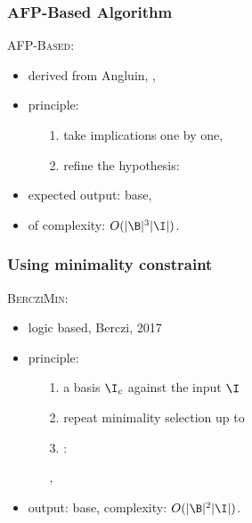\begin{frame}
\frametitle{AFP-Based Algorithm}

\textsc{AFP-Based}:
\begin{itemize}
	\item derived from Angluin, ,
	\item principle:
		\begin{itemize}
			\item[\color{belize} 1.] take implications one by one,
			\item[\color{belize} 2.] refine the hypothesis:
			\item[ ] 
			\item[ ] 
			
		\end{itemize}
	
	\item expected output:  base,
	\item {} of complexity: $O(|\B|^3|\I|)$.

\end{itemize}

\end{frame}

\begin{frame}
\frametitle{Using minimality constraint}

\textsc{BercziMin}:
\begin{itemize}
	\item logic based, Berczi, 2017
	\item principle:
		\begin{itemize}
			\item[\color{belize} 1.]  a basis $\I_c$ against the input $\I$
			
			\item[\color{belize} 2.] repeat minimality selection up to 
			
			\item[\color{belize} 3.] :
			
			\item[ ] ,
			
			\item[ ] 
			 
		\end{itemize}
	\item output:  base, complexity: $O(|\B|^2|\I|)$.
\end{itemize}

\end{frame}




